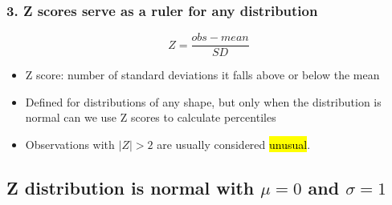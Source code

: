\documentclass[slidestop,compress,mathserif,12pt,t,professionalfonts,xcolor=table]{beamer}
\begin{document}

\begin{frame}
\frametitle{3. Z scores serve as a ruler for any distribution}

\[ Z = \frac{obs - mean}{SD} \]

\begin{itemize}

\item Z score: number of standard deviations it falls above or below the mean

\pause

\item Defined for distributions of any shape, but only when the distribution is normal can we use Z scores to calculate percentiles

\pause

\item Observations with $|Z| > 2$ are usually considered \hl{unusual}.

\end{itemize}


\end{frame}


\subsection{Z distribution is normal with $\mu = 0$ and $\sigma = 1$}
\label{mi4}

\end{document}
